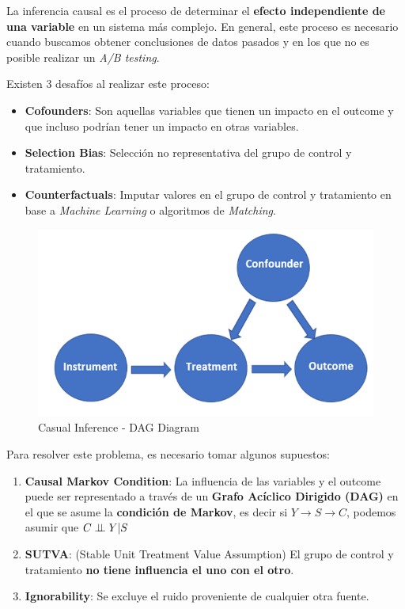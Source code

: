 La inferencia causal es el proceso de determinar el \textbf{efecto independiente de una variable} en un sistema más complejo. En general, este proceso es necesario cuando buscamos obtener conclusiones de datos pasados y en los que no es posible realizar un \textit{A/B testing}.

Existen 3 desafíos al realizar este proceso: 
\begin{itemize}
    \item \textbf{Cofounders}: Son aquellas variables que tienen un impacto en el outcome y que incluso podrían tener un impacto en otras variables. 
    \item \textbf{Selection Bias}: Selección no representativa del grupo de control y tratamiento.
    \item \textbf{Counterfactuals}: Imputar valores en el grupo de control y tratamiento en base a \textit{Machine Learning} o algoritmos de \textit{Matching}. 
\end{itemize}

\begin{figure}[H]
    \center
    \includegraphics[scale=0.3]{notebooks/STATS/img/causal_inference_diagram.png}
    \caption{Casual Inference - DAG Diagram}
\end{figure}

Para resolver este problema, es necesario tomar algunos supuestos: 
\begin{enumerate}
    \item \textbf{Causal Markov Condition}: La influencia de las variables y el outcome puede ser representado a través de un \textbf{Grafo Acíclico Dirigido (DAG)} en el que se asume la \textbf{condición de Markov}, es decir si $Y \rightarrow S \rightarrow C$, podemos asumir que $C \perp \!\!\! \perp Y | S$
    \item \textbf{SUTVA}: (Stable Unit Treatment Value Assumption) El grupo de control y tratamiento \textbf{no tiene influencia el uno con el otro}. 
    \item \textbf{Ignorability}: Se excluye el ruido proveniente de cualquier otra fuente. 
\end{enumerate}

